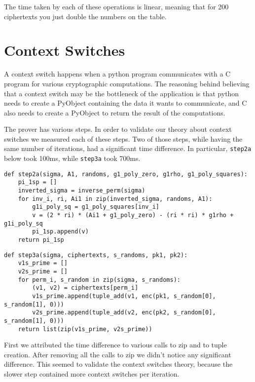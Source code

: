\documentclass{article}
\begin{document}
The time taken by each of these operations is linear, meaning that for
200 ciphertexts you just double the numbers on the table.

\section{Context Switches}

A context switch happens when a python program communicates with a C
program for various cryptographic computations. The reasoning behind
believing that a context switch may be the bottleneck of the application
is that python needs to create a PyObject containing the
data it wants to communicate, and C also needs to create a PyObject to
return the result of the computations.

The prover has various steps. In order to validate our theory about
context switches we measured each of these steps. Two of those steps,
while having the same number of iterations, had a significant time
difference. In particular, \texttt{step2a} below took
100ms, while \texttt{step3a} took 700ms.

\begin{verbatim}
def step2a(sigma, A1, randoms, g1_poly_zero, g1rho, g1_poly_squares):
    pi_1sp = []
    inverted_sigma = inverse_perm(sigma)
    for inv_i, ri, Ai1 in zip(inverted_sigma, randoms, A1):
        g1i_poly_sq = g1_poly_squares[inv_i]
        v = (2 * ri) * (Ai1 + g1_poly_zero) - (ri * ri) * g1rho + g1i_poly_sq
        pi_1sp.append(v)
    return pi_1sp
  \end{verbatim}

\begin{verbatim}
def step3a(sigma, ciphertexts, s_randoms, pk1, pk2):
    v1s_prime = []
    v2s_prime = []
    for perm_i, s_random in zip(sigma, s_randoms):
        (v1, v2) = ciphertexts[perm_i]
        v1s_prime.append(tuple_add(v1, enc(pk1, s_random[0], s_random[1], 0)))
        v2s_prime.append(tuple_add(v2, enc(pk2, s_random[0], s_random[1], 0)))
    return list(zip(v1s_prime, v2s_prime))
\end{verbatim}
  
\noindent
First we attributed the time difference to various calls to zip and to tuple
creation. After removing all the calls to zip we didn't notice any significant
difference. This seemed to validate the context switches theory, because the
slower step contained more context switches per iteration.
\end{document}
